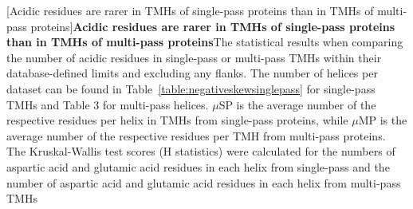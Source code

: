 \begin{table}[htbp]

  \centering
  [Acidic residues are rarer in TMHs of single-pass proteins than in TMHs of multi-pass proteins]{\textbf{Acidic residues are rarer in TMHs of single-pass proteins than in TMHs of multi-pass proteins}The statistical results when comparing the number of acidic residues in single-pass or multi-pass TMHs within their database-defined limits and excluding any flanks.
The number of helices per dataset can be found in Table~\ref{table:negativeskewsinglepass} for single-pass TMHs and Table 3 for multi-pass helices.
$\mu$SP is the average number of the respective residues per helix in TMHs from single-pass proteins, while $\mu$MP is the average number of the respective residues per TMH from multi-pass proteins.
The Kruskal-Wallis test scores (H statistics) were calculated for the numbers of aspartic acid and glutamic acid residues in each helix from single-pass and the number of aspartic acid and glutamic acid residues in each helix from multi-pass TMHs}


\end{table}

